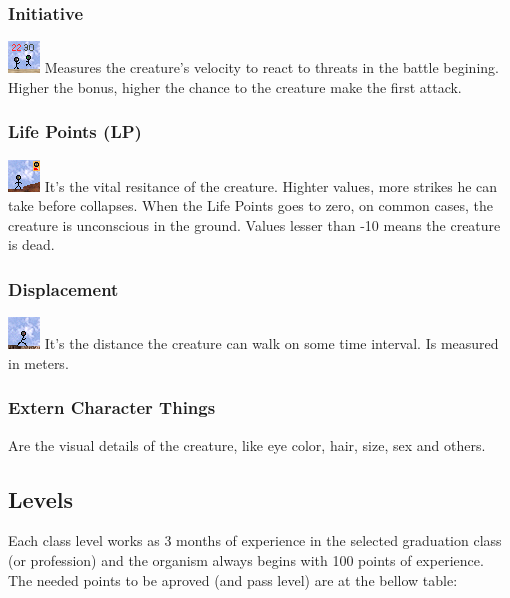 \documentclass[ letterpaper,12pt]{article}
\begin{document}
\subsubsection{Initiative}
\includegraphics{../data/skills/Img/iniciativa.png}
Measures the creature's velocity to react to threats in the battle begining.
Higher the bonus, higher the chance to the creature make the first attack.

\subsubsection{Life Points (LP)}
\includegraphics{../data/skills/Img/pv.png}
It's the vital resitance of the creature. Highter values, more strikes he can
take before collapses. When the Life Points goes to zero, on common cases, the
creature is unconscious in the ground. Values lesser than -10 means the
creature is dead.

\subsubsection{Displacement}
\includegraphics{../data/skills/Img/deslocamento.png}
It's the distance the creature can walk on some time interval. Is measured in meters.

\subsubsection{Extern Character Things}
Are the visual details of the creature, like eye color, hair, size, sex and others.

\subsection{Levels}
Each class level works as 3 months of experience in the selected graduation class
(or profession) and the organism always begins with 100 points of experience.\\
The needed points to be aproved (and pass level) are at the bellow table:
\end{document}
